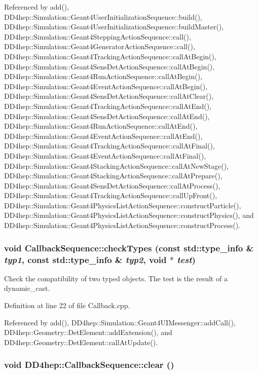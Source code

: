Referenced by add(), DD4hep::Simulation::Geant4UserInitializationSequence::build(), DD4hep::Simulation::Geant4UserInitializationSequence::buildMaster(), DD4hep::Simulation::Geant4SteppingActionSequence::call(), DD4hep::Simulation::Geant4GeneratorActionSequence::call(), DD4hep::Simulation::Geant4TrackingActionSequence::callAtBegin(), DD4hep::Simulation::Geant4SensDetActionSequence::callAtBegin(), DD4hep::Simulation::Geant4RunActionSequence::callAtBegin(), DD4hep::Simulation::Geant4EventActionSequence::callAtBegin(), DD4hep::Simulation::Geant4SensDetActionSequence::callAtClear(), DD4hep::Simulation::Geant4TrackingActionSequence::callAtEnd(), DD4hep::Simulation::Geant4SensDetActionSequence::callAtEnd(), DD4hep::Simulation::Geant4RunActionSequence::callAtEnd(), DD4hep::Simulation::Geant4EventActionSequence::callAtEnd(), DD4hep::Simulation::Geant4TrackingActionSequence::callAtFinal(), DD4hep::Simulation::Geant4EventActionSequence::callAtFinal(), DD4hep::Simulation::Geant4StackingActionSequence::callAtNewStage(), DD4hep::Simulation::Geant4StackingActionSequence::callAtPrepare(), DD4hep::Simulation::Geant4SensDetActionSequence::callAtProcess(), DD4hep::Simulation::Geant4TrackingActionSequence::callUpFront(), DD4hep::Simulation::Geant4PhysicsListActionSequence::constructParticle(), DD4hep::Simulation::Geant4PhysicsListActionSequence::constructPhysics(), and DD4hep::Simulation::Geant4PhysicsListActionSequence::constructProcess().\hypertarget{struct_d_d4hep_1_1_callback_sequence_a79ff90bc3241fad2b0eafd5adb4dee86}{
\subsubsection[{checkTypes}]{\setlength{\rightskip}{0pt plus 5cm}void CallbackSequence::checkTypes (const std::type\_\-info \& {\em typ1}, \/  const std::type\_\-info \& {\em typ2}, \/  void $\ast$ {\em test})}}
\label{struct_d_d4hep_1_1_callback_sequence_a79ff90bc3241fad2b0eafd5adb4dee86}


Check the compatibility of two typed objects. The test is the result of a dynamic\_\-cast. 

Definition at line 22 of file Callback.cpp.

Referenced by add(), DD4hep::Simulation::Geant4UIMessenger::addCall(), DD4hep::Geometry::DetElement::addExtension(), and DD4hep::Geometry::DetElement::callAtUpdate().\hypertarget{struct_d_d4hep_1_1_callback_sequence_a3a410a493cc8cd2424b70c9dd2f0a7e9}{
\subsubsection[{clear}]{\setlength{\rightskip}{0pt plus 5cm}void DD4hep::CallbackSequence::clear ()}}
\label{struct_d_d4hep_1_1_callback_sequence_a3a410a493cc8cd2424b70c9dd2f0a7e9}


